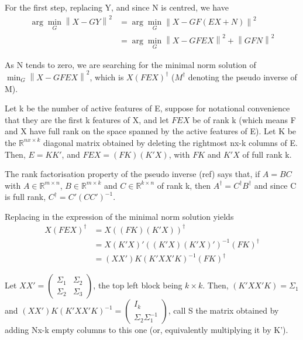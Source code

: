 \documentclass{article}
\begin{document}
For the first step, replacing Y, and since N is centred, we have
\begin{equation}
\begin{aligned}
\arg \min_G \left \| X-GY \right \|^2 &= \arg \min_G \left \| X - GF(EX+N)\right\|^2 \\
&{}= \arg \min_G \left \| X-GFEX\right\| ^2  + \left \| GFN\right \| ^2
\end{aligned}
\end{equation}

As N tends to zero, we are searching for the minimal norm solution of $\min_G \left \| X-GFEX\right\| ^2$, which is $X(FEX)^\dagger$ ($M^\dagger$ denoting the pseudo inverse of M).

Let k be the number of active features of E, suppose for notational convenience that they are the first k features of X, and let $FEX$ be of rank k (which means F and X have full rank on the space spanned by the active features of E). Let K be the $\mathbb{R}^{nx\times k}$ diagonal matrix obtained by deleting the rightmost nx-k columns of E. Then, $E=KK'$, and $FEX=(FK)(K'X)$, with $FK$  and $K'X$ of full rank k.

The rank factorisation property of the pseudo inverse (ref) says that, if $A=BC$ with $A\in\mathbb{R}^{m\times n}$, $B\in\mathbb{R}^{m\times k}$ and $C\in\mathbb{R}^{k\times n}$ of rank k, then $A^\dagger=C^\dagger B^\dagger$ and since C is full rank, $C^\dagger=C' (CC')^{-1}$.

Replacing in the expression of the minimal norm solution yields
\begin{equation}
\begin{aligned}
X(FEX)^\dagger &=X((FK)(K'X))^\dagger \\
&=X(K'X)'((K'X)(K'X)')^{-1}(FK)^\dagger \\
&=(XX')K(K'XX'K)^{-1}(FK)^\dagger 
\end{aligned}
\end{equation}

Let $XX' = \left(\begin{array}{c|c}\Sigma_{1} & \Sigma_{2} \\\hline \Sigma_{2} & \Sigma_{3}\end{array}\right)$, the top left block being $k\times k$. Then, $(K'XX'K)=\Sigma_{1}$ and $(XX')K(K'XX'K)^{-1}=\left(\begin{array}{c}I_{k} \\\hline \Sigma_{2} \Sigma_{1}^{-1}\end{array}\right)$, call S the matrix obtained by adding Nx-k empty columns to this one (or, equivalently multiplying it by K').
\end{document}
